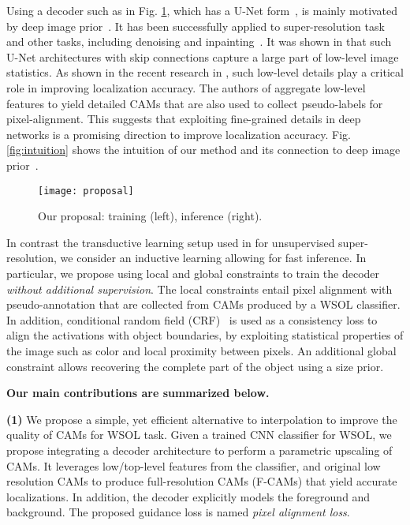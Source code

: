 \documentclass[twocolumn]{article}
\theoremstyle{definition}
\begin{document}
Using a decoder such as in Fig. \ref{fig:proposal}, which has a U-Net form~\cite{Ronneberger-unet-2015}, is mainly motivated by deep image prior~\cite{Ulyanov2020deepip}. It has been successfully applied to super-resolution task and other tasks, including denoising and inpainting~\cite{Ulyanov2020deepip}.
It was shown in \cite{Ulyanov2020deepip} that such U-Net architectures with skip connections capture a large part of low-level image statistics. As shown in the recent research in \cite{wei2021shallowspol}, such low-level details play a critical role in improving localization accuracy. The authors of \cite{wei2021shallowspol} aggregate low-level features to yield detailed CAMs that are also used to collect pseudo-labels for pixel-alignment. This suggests that exploiting fine-grained details in deep networks is a promising direction to improve localization accuracy. Fig.\ref{fig:intuition} shows the intuition of our method and its connection to deep image prior~\cite{Ulyanov2020deepip}.
\begin{figure}[ht!]
\centering
  \centering
  \texttt{[image: proposal]}
  \caption{Our proposal: training (left), inference (right).}
  \label{fig:proposal}
\end{figure}
In contrast the transductive learning setup used in \cite{Ulyanov2020deepip} for unsupervised super-resolution, we consider an inductive learning allowing for fast inference. In particular, we propose using local and global constraints to train the decoder \emph{without additional supervision}. The local constraints entail pixel alignment with pseudo-annotation that are collected from CAMs produced by a WSOL classifier. In addition, conditional random field (CRF)~\cite{tang2018regularized} is used as a consistency loss to align the activations with  object boundaries, by exploiting statistical properties of the image such as color and local proximity between pixels. An additional global constraint allows recovering the complete part of the object using a size prior.

\textbf{Our main contributions are summarized below.}

\noindent \textbf{(1)} We propose a simple, yet efficient alternative to interpolation to improve the quality of CAMs for WSOL task. Given a trained CNN classifier for WSOL, we propose integrating a decoder architecture to perform a parametric upscaling of CAMs. It leverages low/top-level features from the classifier, and original low resolution CAMs to produce full-resolution CAMs (F-CAMs) that yield accurate localizations. In addition, the decoder explicitly models the foreground and background. The proposed guidance loss is named \textit{pixel alignment loss}.
\end{document}
